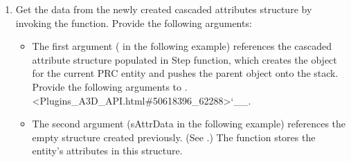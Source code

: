 \documentclass[letterpaper,12pt,english,openany,oneside]{sphinxmanual}
\begin{document}
\begin{sphinxVerbatim}[commandchars=\\\{\}]
     
\end{sphinxVerbatim}
\begin{enumerate}
%
\item {} 
Get the data from the newly created cascaded attributes structure by invoking the  function. Provide the following arguments:
\begin{itemize}
\item {} 
The first argument ( in the following example) references the cascaded attribute structure populated in Step  function, which creates the  object for the current PRC entity and pushes the parent  object onto the stack. Provide the following arguments to . <Plugins\_A3D\_API.html\#50618396\_62288>`\_\_.

\item {} 
The second argument (sAttrData in the following example) references the empty  structure created previously. (See .) The  function stores the entity’s attributes in this structure.

\end{itemize}

\end{enumerate}

\begin{sphinxVerbatim}[commandchars=\\\{\}]
   
\end{sphinxVerbatim}
\end{document}
